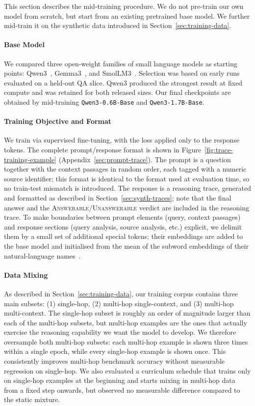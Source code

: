 This section describes the mid-training procedure. We do not pre-train our own model from scratch, but start from an existing pretrained base model. We further mid-train it on the synthetic data introduced in Section~\ref{sec:training-data}.

\paragraph{Base Model}
We compared three open-weight families of small language models as starting points: Qwen3~\citep{qwen3}, Gemma3~\citep{gemma3}, and SmolLM3~\citep{smollm3}. Selection was based on early runs evaluated on a held-out QA slice. Qwen3 produced the strongest result at fixed compute and was retained for both released sizes. Our final checkpoints are obtained by mid-training \texttt{Qwen3-0.6B-Base} and \texttt{Qwen3-1.7B-Base}.

\paragraph{Training Objective and Format}
We train via supervised fine-tuning, with the loss applied only to the response tokens. The complete prompt/response format is shown in Figure~\ref{fig:trace-training-example} (Appendix~\ref{sec:prompt-trace}). The prompt is a question together with the context passages in random order, each tagged with a numeric source identifier; this format is identical to the format used at evaluation time, so no train-test mismatch is introduced. The response is a reasoning trace, generated and formatted as described in Section~\ref{sec:synth-traces}; note that the final answer and the \textsc{Answerable}/\textsc{Unanswerable} verdict are included in the reasoning trace. To make boundaries between prompt elements (query, context passages) and response sections (query analysis, source analysis, etc.) explicit, we delimit them by a small set of additional special tokens; their embeddings are added to the base model and initialised from the mean of the subword embeddings of their natural-language names~\citep{hewitt2021vocab}.

\paragraph{Data Mixing}
As described in Section~\ref{sec:training-data}, our training corpus contains three main subsets: (1) single-hop, (2) multi-hop single-context, and (3) multi-hop multi-context. The single-hop subset is roughly an order of magnitude larger than each of the multi-hop subsets, but multi-hop examples are the ones that actually exercise the reasoning capability we want the model to develop. We therefore oversample both multi-hop subsets: each multi-hop example is shown three times within a single epoch, while every single-hop example is shown once. This consistently improves multi-hop benchmark accuracy without measurable regression on single-hop. We also evaluated a curriculum schedule that trains only on single-hop examples at the beginning and starts mixing in multi-hop data from a fixed step onwards, but observed no measurable difference compared to the static mixture.


